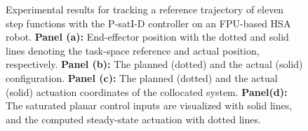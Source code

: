 \begin{figure}[ht]
    \caption{Experimental results for tracking a reference trajectory of eleven step functions with the P-satI-D controller on an FPU-based HSA robot. \textbf{Panel (a):} End-effector position with the dotted and solid lines denoting the task-space reference and actual position, respectively.
    \textbf{Panel (b):} The planned (dotted) and the actual (solid) configuration. 
    \textbf{Panel (c):} The planned (dotted) and the actual (solid) actuation coordinates of the collocated system. 
    \textbf{Panel(d):} The saturated planar control inputs are visualized with solid lines, and the computed steady-state actuation with dotted lines.}\label{fig:hsacontrol:hsacontrol:experimental_results:fpu:p_sati_d}
\end{figure}


